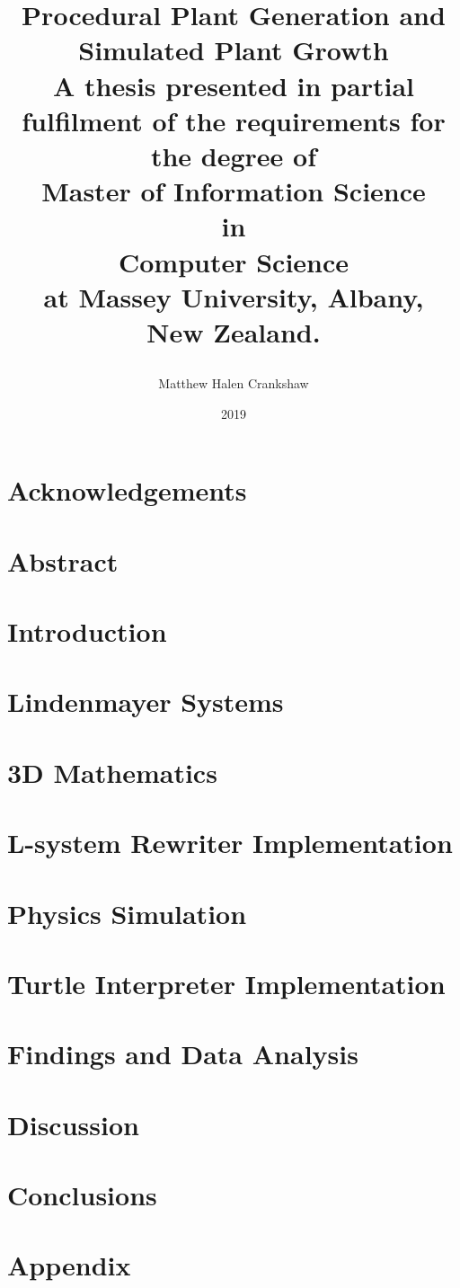 \documentclass[11pt]{report}
\title{
{\huge Procedural Plant Generation and Simulated Plant Growth }\\
\vspace{3cm}
{\large A thesis presented in partial fulfilment of the requirements for the degree of \\
\vspace{4cm}
\large Master of Information Science\\
\large in\\
\large Computer Science\\
\vspace{4cm}
\large at Massey University, Albany, \\
\large New Zealand. }
\vspace{3cm}
\author{Matthew Halen Crankshaw}
\date{2019}
}
\begin{document}
\maketitle

\chapter*{Acknowledgements}

\chapter*{Abstract}

\tableofcontents
\listoffigures
\listoftables


\chapter{Introduction}


\chapter{Lindenmayer Systems}  \label{l-system chapter} 


\chapter{3D Mathematics}


\chapter{L-system Rewriter Implementation}


\chapter{Physics Simulation}


\chapter{Turtle Interpreter Implementation}


\chapter{Findings and Data Analysis}


\chapter{Discussion}


\chapter{Conclusions}


\printglossary[type=\acronymtype]
\printglossary

\appendix
\chapter{Appendix}

\end{document}
